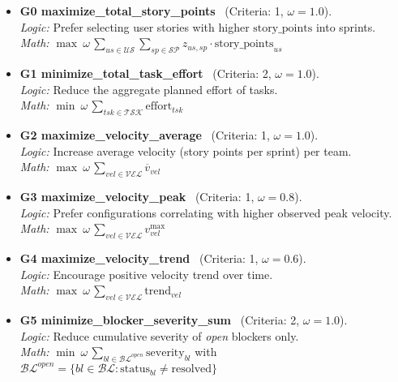 \documentclass[11pt,a4paper]{article}
\begin{document}
\begin{itemize}[leftmargin=2em]
  \item \textbf{G0 maximize\_total\_story\_points} \ (Criteria: 1, \(\omega=1.0\)). \\
  \emph{Logic:} Prefer selecting user stories with higher \(\text{story\_points}\) into sprints. \\
  \emph{Math:} \(\displaystyle \max \ \omega\,\sum_{us\in\mathcal{US}}\sum_{sp\in\mathcal{SP}} z_{us,sp}\cdot \text{story\_points}_{us}\)
  
  \item \textbf{G1 minimize\_total\_task\_effort} \ (Criteria: 2, \(\omega=1.0\)). \\
  \emph{Logic:} Reduce the aggregate planned effort of tasks. \\
  \emph{Math:} \(\displaystyle \min \ \omega\,\sum_{tsk\in\mathcal{TSK}} \text{effort}_{tsk}\)

  \item \textbf{G2 maximize\_velocity\_average} \ (Criteria: 1, \(\omega=1.0\)). \\
  \emph{Logic:} Increase average velocity (story points per sprint) per team. \\
  \emph{Math:} \(\displaystyle \max \ \omega\,\sum_{vel\in\mathcal{VEL}} \overline{v}_{vel}\)

  \item \textbf{G3 maximize\_velocity\_peak} \ (Criteria: 1, \(\omega=0.8\)). \\
  \emph{Logic:} Prefer configurations correlating with higher observed peak velocity. \\
  \emph{Math:} \(\displaystyle \max \ \omega\,\sum_{vel\in\mathcal{VEL}} v^{\max}_{vel}\)

  \item \textbf{G4 maximize\_velocity\_trend} \ (Criteria: 1, \(\omega=0.6\)). \\
  \emph{Logic:} Encourage positive velocity trend over time. \\
  \emph{Math:} \(\displaystyle \max \ \omega\,\sum_{vel\in\mathcal{VEL}} \text{trend}_{vel}\)

  \item \textbf{G5 minimize\_blocker\_severity\_sum} \ (Criteria: 2, \(\omega=1.0\)). \\
  \emph{Logic:} Reduce cumulative severity of \emph{open} blockers only. \\
  \emph{Math:} \(\displaystyle \min \ \omega\,\sum_{bl\in\mathcal{BL}^{open}} \text{severity}_{bl}\) \quad with \(\mathcal{BL}^{open}=\{bl\in\mathcal{BL}:\text{status}_{bl}\neq\text{resolved}\}\)


\end{itemize}
\end{document}
